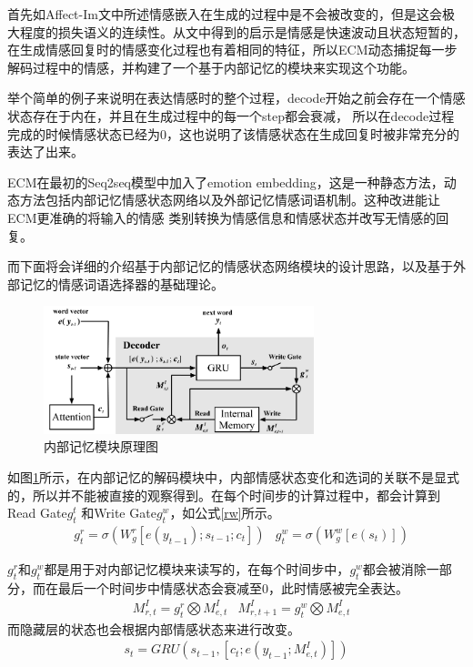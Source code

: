\documentclass[supercite]{HustGraduPaper}
\theoremstyle{definition}
\begin{document}
首先如Affect-Im\cite{ghosh2017affect}文中所述情感嵌入在生成的过程中是不会被改变的，但是这会极大程度的损失语义的连续性。从文中得到的启示是情感是快速波动且状态短暂的，
在生成情感回复时的情感变化过程也有着相同的特征，所以ECM动态捕捉每一步解码过程中的情感，并构建了一个基于内部记忆的模块来实现这个功能。

举个简单的例子来说明在表达情感时的整个过程，decode开始之前会存在一个情感状态存在于内在，并且在生成过程中的每一个step都会衰减，
所以在decode过程完成的时候情感状态已经为0，这也说明了该情感状态在生成回复时被非常充分的表达了出来。

ECM在最初的Seq2seq模型中加入了emotion embedding，这是一种静态方法，动态方法包括内部记忆情感状态网络以及外部记忆情感词语机制。这种改进能让ECM更准确的将输入的情感
类别转换为情感信息和情感状态并改写无情感的回复。

而下面将会详细的介绍基于内部记忆的情感状态网络模块的设计思路，以及基于外部记忆的情感词语选择器的基础理论。

\begin{figure}[H] %
  \centering %
  \includegraphics[width=0.7\textwidth]{images/imemory.png} %
  \caption{内部记忆模块原理图} %
  \label{Fig.imemory} %
\end{figure}

如图\ref{Fig.imemory}所示，在内部记忆的解码模块中，内部情感状态变化和选词的关联不是显式的，所以并不能被直接的观察得到。在每个时间步的计算过程中，都会计算到Read Gate$g_t^t$
和Write Gate$g_t^w$，如公式\ref{rw}所示。
\begin{align}
  &g_t^r = \sigma(W_g^r[e(y_{t-1});s_{t-1};c_t])
  &g_t^w = \sigma(W_g^w[e(s_t)]) \label{rw}
\end{align}

$g_t^r$和$g_t^w$都是用于对内部记忆模块来读写的，在每个时间步中，$g_t^w$都会被消除一部分，而在最后一个时间步中情感状态会衰减至0，此时情感被完全表达。
\begin{align}
  &M_{r,t}^I = g_t^r \bigotimes M_{e,t}^I
  &M_{r,t+1}^I = g_t^w \bigotimes M_{e,t}^I
\end{align}
而隐藏层的状态也会根据内部情感状态来进行改变。
\begin{align}
  s_t = GRU(s_{t-1},[c_t;e(y_{t-1};M_{e,t}^I)])
\end{align}
\end{document}
